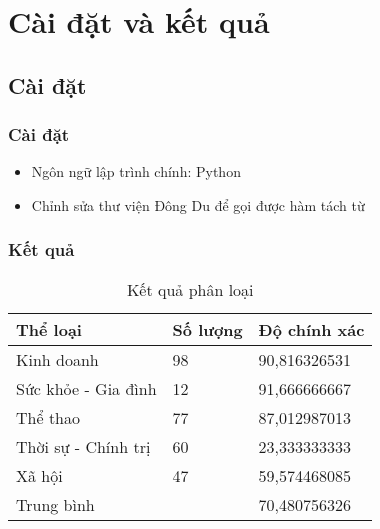 
\section{Cài đặt và kết quả}

\subsection{Cài đặt}

\begin{frame}
  \frametitle{Cài đặt}
  \begin{itemize}[<+->]
    \item Ngôn ngữ lập trình chính: Python
    \item Chỉnh sửa thư viện Đông Du để gọi được hàm tách từ
  \end{itemize}
\end{frame}

\begin{frame}
  \frametitle{Kết quả}
    \begin{flushleft}
    \begin{table}[p]
      \begin{tabular}{|l|l|l|}
        \hline
        Thể loại & Số lượng & Độ chính xác \\ \hline
        Kinh doanh & 98 & 90,816326531 \\ \hline
        Sức khỏe - Gia đình & 12 & 91,666666667 \\ \hline
        Thể thao & 77 & 87,012987013 \\ \hline
        Thời sự - Chính trị & 60 & 23,333333333 \\ \hline
        Xã hội & 47 & 59,574468085 \\ \hline
        Trung bình & & 70,480756326 \\ \hline
      \end{tabular}
      \caption{Kết quả phân loại}
    \end{table}
  \end{flushleft}
\end{frame}
